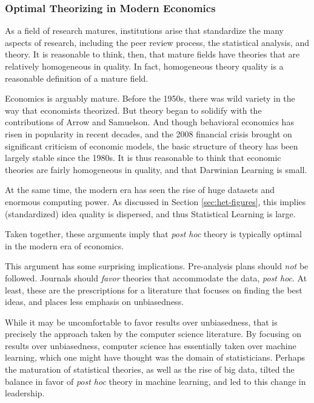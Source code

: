 \documentclass[12pt,english]{article}
\theoremstyle{plain}
\theoremstyle{plain}
\begin{document}
\subsubsection{Optimal Theorizing in Modern Economics}\label{sec:het-econcomment}

As a field of research matures, institutions arise that standardize the many aspects of research, including the peer review process, the statistical analysis, and  theory. It is reasonable to think, then, that mature fields have theories that are relatively homogeneous in quality. In fact, homogeneous theory quality is a reasonable definition of a mature field.

Economics is arguably mature. Before the 1950s, there was wild variety in the way that economists theorized. But theory began to solidify with the contributions of Arrow and Samuelson. And though behavioral economics has risen in popularity in recent decades, and the 2008 financial crisis brought on significant criticism of economic models, the basic structure of theory has been largely stable since the 1980s. It is thus reasonable to think that economic theories are fairly homogeneous in quality, and that Darwinian Learning is small. 

At the same time, the modern era has seen the rise of huge datasets and enormous computing power. As discussed in Section \ref{sec:het-figures}, this implies (standardized) idea quality is dispersed, and thus Statistical Learning is large. 

Taken together, these arguments imply that \emph{post hoc} theory is typically optimal in the modern era of economics.

This argument has some surprising implications. Pre-analysis plans should \emph{not} be followed.  Journals should \emph{favor}  theories that accommodate the data, \emph{post hoc}. At least, these are the prescriptions for a literature that focuses on finding the best ideas, and places less emphasis on unbiasedness. 

While it may be uncomfortable to favor results over unbiasedness, that is precisely the approach taken by the computer science literature. By focusing on results over unbiasedness, computer science has essentially taken over machine learning, which one might have thought was the domain of statisticians. Perhaps the maturation of statistical theories, as well as the rise of big data, tilted the balance in favor of \emph{post hoc} theory in machine learning, and led to this change in leadership.
\end{document}
